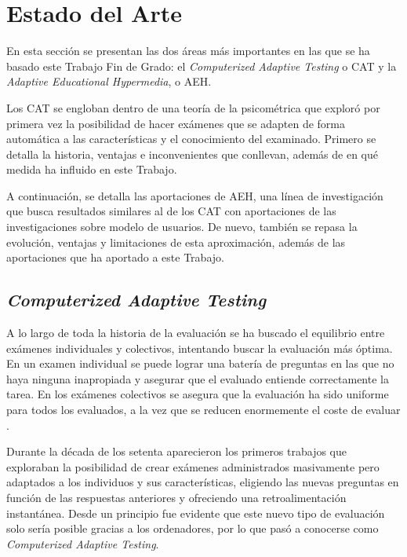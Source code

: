 \chapter{Estado del Arte\label{sec:estado_del_arte}}

En esta sección se presentan las dos áreas más importantes en las que se ha basado este Trabajo Fin de Grado: el \textit{Computerized Adaptive Testing} o \acrshort{CAT} y la \textit{Adaptive Educational Hypermedia}, o \acrshort{AEH}.

Los \acrshort{CAT} se engloban dentro de una teoría de la psicométrica que exploró por primera vez la posibilidad de hacer exámenes que se adapten de forma automática a las características y el conocimiento del examinado. Primero se detalla la historia, ventajas e inconvenientes que conllevan, además de en qué medida ha influido en este Trabajo. 

A continuación, se detalla las aportaciones de \acrshort{AEH}, una línea de investigación que busca resultados similares al de los \acrshort{CAT} con aportaciones de las investigaciones sobre modelo de usuarios. De nuevo, también se repasa la evolución, ventajas y limitaciones de esta aproximación, además de las aportaciones que ha aportado a este Trabajo.

\section{\textit{Computerized Adaptive Testing}}

A lo largo de toda la historia de la evaluación se ha buscado el equilibrio entre exámenes individuales y colectivos, intentando buscar la evaluación más óptima. En un examen individual se puede lograr una batería de preguntas en las que no haya ninguna inapropiada y asegurar que el evaluado entiende correctamente la tarea. En los exámenes colectivos se asegura que la evaluación ha sido uniforme para todos los evaluados, a la vez que se reducen enormemente el coste de evaluar \cite{Wainer00}.

Durante la década de los setenta aparecieron los primeros trabajos que exploraban la posibilidad de crear exámenes administrados masivamente pero adaptados a los individuos y sus características, eligiendo las nuevas preguntas en función de las respuestas anteriores y ofreciendo una retroalimentación instantánea\cite{Lord68}. Desde un principio fue evidente que este nuevo tipo de evaluación solo sería posible gracias a los ordenadores, por lo que pasó a conocerse como \textit{Computerized Adaptive Testing}.

